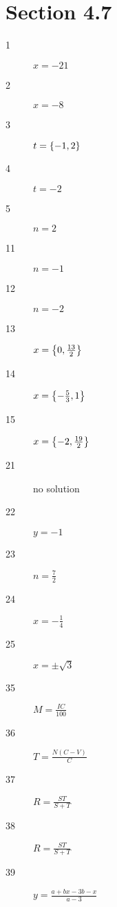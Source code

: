\documentclass[letterpaper, landscape]{exam}
\begin{document}
  \ifprintanswers{}
    \newpage
    \section{Section 4.7} %
    
    \begin{description}

      \item[1] $x = -21$

      \item[2] $x = -8$

      \item[3] $t = \cbr{ -1, 2 }$

      \item[4] $t = -2$

      \item[5] $n = 2$

      \item[11] $n = -1$

      \item[12] $n = -2$

      \item[13] $x = \cbr{ 0, \frac{13}{2} }$

      \item[14] $x = \cbr{ - \frac{5}{3}, 1 }$

      \item[15] $x = \cbr{ -2, \frac{19}{2} }$

      \item[21] no solution

      \item[22] $y = -1$

      \item[23] $n = \frac{7}{2}$

      \item[24] $x = - \frac{1}{4}$

      \item[25] $x = \pm \sqrt{3}$

      \item[35] $M = \frac{IC}{100}$

      \item[36] $T = \frac{N(C - V)}{C}$

      \item[37] $R = \frac{ST}{S + T}$

      \item[38] $R = \frac{ST}{S + T}$

      \item[39] $y = \frac{a + bx - 3b - x}{a - 3}$


\end{description}
\end{document}
